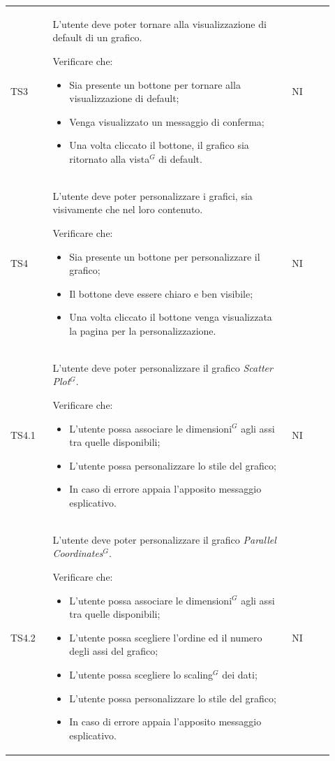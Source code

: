 \begin{longtable}{p{0.12\linewidth}p{0.68\linewidth}p{0.12\linewidth}}
    \rowcolor[RGB]{233, 245, 206}
    TS3 & 
    L'utente deve poter tornare alla visualizzazione di default di un grafico. \par 
    Verificare che:
    \begin{itemize}
        \item Sia presente un bottone per tornare alla visualizzazione di default;
        \item Venga visualizzato un messaggio di conferma;
        \item Una volta cliccato il bottone, il grafico sia ritornato alla vista$^{G}$ di default.
    \end{itemize}&
    NI\\

    \rowcolor[RGB]{216, 235, 171}
    TS4 &
    L'utente deve poter personalizzare i grafici, sia visivamente che nel loro contenuto. \par
    Verificare che:
    \begin{itemize}
        \item Sia presente un bottone per personalizzare il grafico;
        \item Il bottone deve essere chiaro e ben visibile;
        \item Una volta cliccato il bottone venga visualizzata la pagina per la personalizzazione.
    \end{itemize}&
    NI\\

    \rowcolor[RGB]{233, 245, 206}
    TS4.1 &
    L'utente deve poter personalizzare il grafico \textit{Scatter Plot}$^{G}$. \par
    Verificare che:
    \begin{itemize}
        \item L'utente possa associare le dimensioni$^{G}$ agli assi tra quelle disponibili;
        \item L'utente possa personalizzare lo stile del grafico;
        \item In caso di errore appaia l'apposito messaggio esplicativo.
    \end{itemize}&
    NI \\

    \rowcolor[RGB]{216, 235, 171}
    TS4.2 &
    L'utente deve poter personalizzare il grafico \textit{Parallel Coordinates}$^{G}$. \par
    Verificare che:
    \begin{itemize}
        \item L'utente possa associare le dimensioni$^{G}$ agli assi tra quelle disponibili;
        \item L'utente possa scegliere l'ordine ed il numero degli assi del grafico;
        \item L'utente possa scegliere lo scaling$^{G}$ dei dati;
        \item L'utente possa personalizzare lo stile del grafico;
        \item In caso di errore appaia l'apposito messaggio esplicativo.
    \end{itemize}&
    NI \\


\end{longtable}
